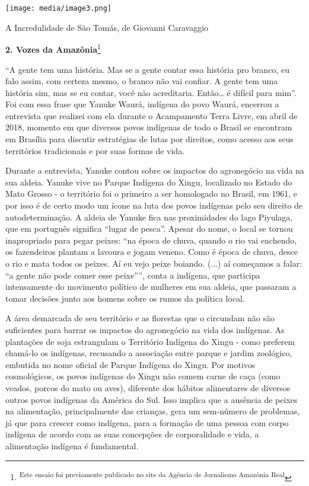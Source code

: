 \texttt{[image: media/image3.png]}

A Incredulidade de São Tomás, de Giovanni Caravaggio

\textbf{2. Vozes da Amazônia}\footnote{\textsuperscript{Este ensaio foi
  previamente publicado no site da Agência de Jornalismo Amazônia Real}}

``A gente tem uma história. Mas se a gente contar essa história pro
branco, eu falo assim, com certeza mesmo, o branco não vai confiar. A
gente tem uma história sim, mas se eu contar, você não acreditaria.
Então\ldots{} é difícil para mim''. Foi com essa frase que Yanuke Waurá,
indígena do povo Waurá, encerrou a entrevista que realizei com ela
durante o Acampamento Terra Livre, em abril de 2018, momento em que
diversos povos indígenas de todo o Brasil se encontram em Brasília para
discutir estratégias de lutas por direitos, como acesso aos seus
territórios tradicionais e por suas formas de vida.

Durante a entrevista, Yanuke contou sobre os impactos do agronegócio na
vida na sua aldeia. Yanuke vive no Parque Indígena do Xingu, localizado
no Estado do Mato Grosso - o território foi o primeiro a ser homologado
no Brasil, em 1961, e por isso é de certo modo um ícone na luta dos
povos indígenas pelo seu direito de autodeterminação. A aldeia de Yanuke
fica nas proximidades do lago Piyulaga, que em português significa
``lugar de pesca''. Apesar do nome, o local se tornou inapropriado para
pegar peixes: ``na época de chuva, quando o rio vai enchendo, os
fazendeiros plantam a lavoura e jogam veneno. Como é época de chuva,
desce o rio e mata todos os peixes. Aí eu vejo peixe boiando. (...) aí
começamos a falar: ``a gente não pode comer esse peixe'''', conta a
indígena, que participa intensamente do movimento político de mulheres
em sua aldeia, que passaram a tomar decisões junto aos homens sobre os
rumos da política local.

A área demarcada de seu território e as florestas que o circundam não
são suficientes para barrar os impactos do agronegócio na vida dos
indígenas. As plantações de soja estrangulam o Território Indígena do
Xingu - como preferem chamá-lo os indígenas, recusando a associação
entre parque e jardim zoológico, embutida no nome oficial de Parque
Indígena do Xingu. Por motivos cosmológicos, os povos indígenas do Xingu
não comem carne de caça (como veados, porcos do mato ou aves), diferente
dos hábitos alimentares de diversos outros povos indígenas da América do
Sul. Isso implica que a ausência de peixes na alimentação,
principalmente das crianças, gera um sem-número de problemas, já que
para crescer como indígena, para a formação de uma pessoa com corpo
indígena de acordo com as suas concepções de corporalidade e vida, a
alimentação indígena é fundamental.

